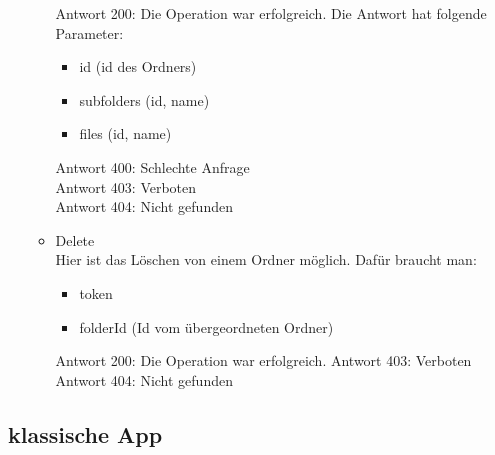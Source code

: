 \begin{enumerate}
\begin{itemize}
\begin{itemize}
\end{itemize}
Antwort 200: Die Operation war erfolgreich. Die Antwort hat folgende Parameter:
\begin{itemize}
	\item id (id des Ordners)
	\item subfolders (id, name)
	\item files (id, name)
\end{itemize}
Antwort 400: Schlechte Anfrage \\
Antwort 403: Verboten \\
Antwort 404: Nicht gefunden
\item Delete \\
Hier ist das L\"oschen von einem Ordner m\"oglich. Daf\"ur braucht man: 
\begin{itemize}
\item token
\item folderId (Id vom \"ubergeordneten Ordner) 
\end{itemize}
Antwort 200: Die Operation war erfolgreich.
Antwort 403: Verboten \\
Antwort 404: Nicht gefunden
\end{itemize}
\end{enumerate}

\subsection{klassische App}
